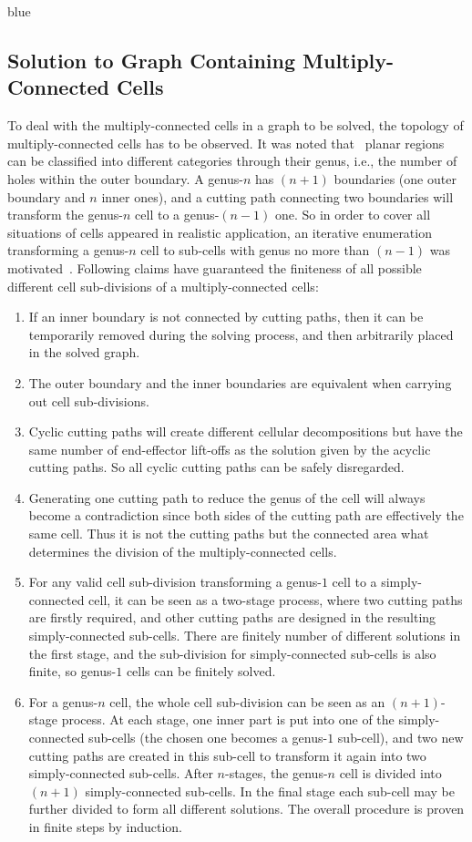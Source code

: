 \documentclass[Afour,sageh,times]{sagej}
\begin{document}
\begin{color}{blue}
\subsection{Solution to Graph Containing Multiply-Connected Cells}
To deal with the multiply-connected cells in a graph to be solved, the topology of multiply-connected cells has to be observed. 
It was noted that~\cite{Simmons1964Introduction} planar regions can be classified into different categories through their genus, i.e., the number of holes within the outer boundary. 
A genus-$n$ has $(n+1)$ boundaries (one outer boundary and $n$ inner ones), and a cutting path connecting two boundaries will transform the genus-$n$ cell to a genus-$(n-1)$ one. 
So in order to cover all situations of cells appeared in realistic application, an iterative enumeration transforming a genus-$n$ cell to sub-cells with genus no more than $(n-1)$ was motivated~\cite{Yang2020Nonrevisiting}. 
Following claims have guaranteed the finiteness of all possible different cell sub-divisions of a multiply-connected cells: 
\begin{enumerate}
\item If an inner boundary is not connected by cutting paths, then it can be temporarily removed during the solving process, and then arbitrarily placed in the solved graph. 
\item The outer boundary and the inner boundaries are equivalent when carrying out cell sub-divisions. 
\item Cyclic cutting paths will create different cellular decompositions but have the same number of end-effector lift-offs as the solution given by the acyclic cutting paths. So all cyclic cutting paths can be safely disregarded. 
\item Generating one cutting path to reduce the genus of the cell will always become a contradiction since both sides of the cutting path are effectively the same cell. Thus it is not the cutting paths but the connected area what determines the division of the multiply-connected cells. 
\item For any valid cell sub-division transforming a genus-$1$ cell to a simply-connected cell, it can be seen as a two-stage process, where two cutting paths are firstly required, and other cutting paths are designed in the resulting simply-connected sub-cells. There are finitely number of different solutions in the first stage, and the sub-division for simply-connected sub-cells is also finite, so genus-$1$ cells can be finitely solved. 
\item For a genus-$n$ cell, the whole cell sub-division can be seen as an $(n+1)$-stage process. At each stage, one inner part is put into one of the simply-connected sub-cells (the chosen one becomes a genus-$1$ sub-cell), and two new cutting paths are created in this sub-cell to transform it again into two simply-connected sub-cells. After $n$-stages, the genus-$n$ cell is divided into $(n+1)$ simply-connected sub-cells. 
In the final stage each sub-cell may be further divided to form all different solutions. 
The overall procedure is proven in finite steps by induction.  
\end{enumerate}
\end{color}
\end{document}
